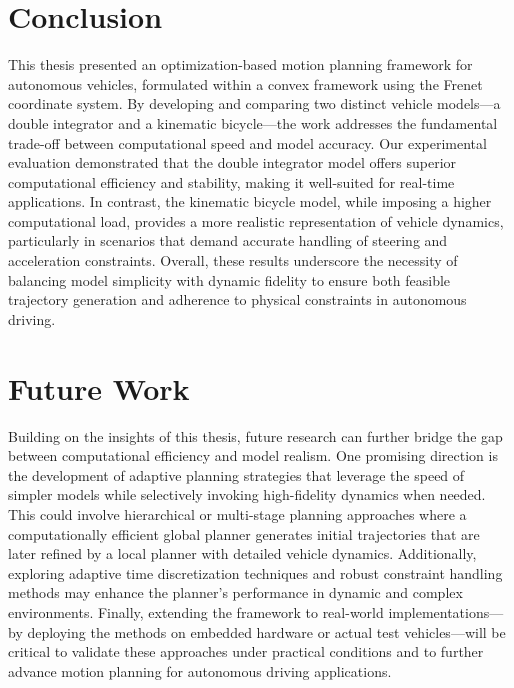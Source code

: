 \section{Conclusion} \label{sec:conclusion}

This thesis presented an optimization-based motion planning framework for autonomous vehicles, formulated within a convex framework using the Frenet
coordinate system.
By developing and comparing two distinct vehicle models—a double integrator and a kinematic bicycle—the work addresses the fundamental trade-off
between computational speed and model accuracy.
Our experimental evaluation demonstrated that the double integrator model offers superior computational efficiency and stability, making it
well-suited for real-time applications.
In contrast, the kinematic bicycle model, while imposing a higher computational load, provides a more realistic representation of vehicle dynamics,
particularly in scenarios that demand accurate handling of steering and acceleration constraints.
Overall, these results underscore the necessity of balancing model simplicity with dynamic fidelity to ensure both feasible trajectory generation and
adherence to physical constraints in autonomous driving.

\section{Future Work} \label{sec:future_work}

Building on the insights of this thesis, future research can further bridge the gap between computational efficiency and model realism.
One promising direction is the development of adaptive planning strategies that leverage the speed of simpler models while selectively invoking
high-fidelity dynamics when needed.
This could involve hierarchical or multi-stage planning approaches where a computationally efficient global planner generates initial trajectories
that are later refined by a local planner with detailed vehicle dynamics.
Additionally, exploring adaptive time discretization techniques and robust constraint handling methods may enhance the planner's performance in
dynamic and complex environments.
Finally, extending the framework to real-world implementations—by deploying the methods on embedded hardware or actual test vehicles—will be critical
to validate these approaches under practical conditions and to further advance motion planning for autonomous driving applications.
